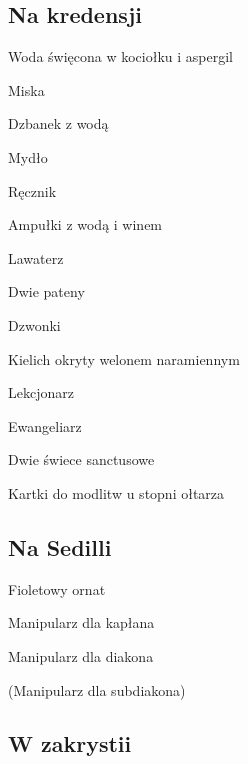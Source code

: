 \begin{paracol}{2}
	\subsection{Na kredensji}

	\begin{itemize*}
		\item Woda święcona w kociołku i aspergil
		\item Miska
		\item Dzbanek z wodą
		\item Mydło
		\item Ręcznik
		\item Ampułki z wodą i winem
		\item Lawaterz
		\item Dwie pateny
		\item Dzwonki
		\item Kielich okryty welonem naramiennym
		\item Lekcjonarz
		\item Ewangeliarz
		\item Dwie świece sanctusowe
		\item Kartki do modlitw u stopni ołtarza
	\end{itemize*}

	\subsection{Na Sedilli}

	\begin{itemize*}
		{\color{violet}
		\item Fioletowy ornat
		\item Manipularz dla kapłana
		\item Manipularz dla diakona
		\item (Manipularz dla subdiakona)}
	\end{itemize*}

	\subsection{W zakrystii}


\end{paracol}
